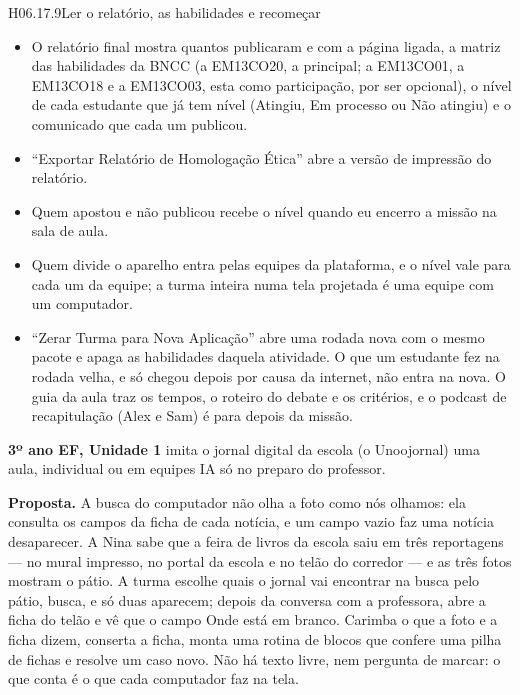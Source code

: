 \begin{historia}{H06.17.9}{Ler o relatório, as habilidades e recomeçar}{\pronto}
\aceite
\begin{itemize}
  \item O relatório final mostra quantos publicaram e com a página ligada, a
    matriz das habilidades da BNCC (a EM13CO20, a principal; a EM13CO01, a
    EM13CO18 e a EM13CO03, esta como participação, por ser opcional), o nível
    de cada estudante que já tem nível (Atingiu, Em processo ou Não atingiu)
    e o comunicado que cada um publicou.
  \item \enquote{Exportar Relatório de Homologação Ética} abre a versão de
    impressão do relatório.
  \item Quem apostou e não publicou recebe o nível quando eu encerro a missão
    na sala de aula.
  \item Quem divide o aparelho entra pelas equipes da plataforma, e o nível
    vale para cada um da equipe; a turma inteira numa tela projetada é uma
    equipe com um computador.
  \item \enquote{Zerar Turma para Nova Aplicação} abre uma rodada nova com o
    mesmo pacote e apaga as habilidades daquela atividade. O que um estudante
    fez na rodada velha, e só chegou depois por causa da internet, não entra
    na nova. O guia da aula
    traz os tempos, o roteiro do debate e os critérios, e o podcast de
    recapitulação (Alex e Sam) é para depois da missão.
\end{itemize}
\end{historia}


\textbf{3º ano EF, Unidade 1} \textperiodcentered{} imita o jornal digital da
escola (o Unoojornal) \textperiodcentered{} uma aula, individual ou em
equipes \textperiodcentered{} IA só no preparo do professor.

\textbf{Proposta.} A busca do computador não olha a foto como nós olhamos:
ela consulta os campos da ficha de cada notícia, e um campo vazio faz uma
notícia desaparecer. A Nina sabe que a feira de livros da escola saiu em três
reportagens --- no mural impresso, no portal da escola e no telão do corredor
--- e as três fotos mostram o pátio. A turma escolhe quais o jornal vai
encontrar na busca pelo pátio, busca, e só duas aparecem; depois da conversa
com a professora, abre a ficha do telão e vê que o campo Onde está em branco.
Carimba o que a foto e a ficha dizem, conserta a ficha, monta uma rotina de
blocos que confere uma pilha de fichas e resolve um caso novo. Não há texto
livre, nem pergunta de marcar: o que conta é o que cada computador faz na tela.

